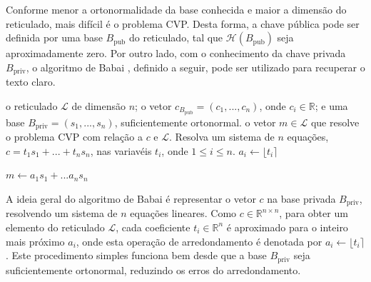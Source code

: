 \documentclass{SBCbookchapter}
\begin{document}
\begin{otherlanguage}{brazilian}
Conforme menor a ortonormalidade da base conhecida e maior a dimensão do reticulado, mais difícil é o problema CVP. 
Desta forma, a chave pública pode ser definida por uma base $B_\mathrm{pub}$ do reticulado, tal que
$\mathcal{H}(B_\mathrm{pub})$ seja aproximadamente zero. Por outro lado, com o conhecimento da chave privada $B_\mathrm{priv}$, 
o algoritmo de Babai \cite{Babai86onlovasz}, definido a seguir, pode ser utilizado para recuperar o texto claro.

\begin{algorithm}[b]
\caption{Algoritmo de Babai}
\begin{algorithmic}
\Require o reticulado $\mathcal{L}$ de dimensão $n$; o vetor $c_{B_\mathrm{pub}} = (c_1, ..., c_n)$, onde $c_i \in \mathbb{R}$; 
e uma base $B_\mathrm{priv} = (s_1, ..., s_n)$, suficientemente ortonormal.
\Ensure o vetor $m \in \mathcal{L}$ que resolve o problema CVP com relação a $c$ e $\mathcal{L}$.
\State Resolva um sistema de $n$ equações, $c = t_1s_1 + ... + t_ns_n$, nas variavéis $t_i$, onde $1 \leq i \leq n$.
\State $a_i \leftarrow \lfloor t_i \rceil$
\EndFor 

\Return $m \leftarrow a_1s_1 + ... a_ns_n$
\end{algorithmic}
\end{algorithm}

A ideia geral do algoritmo de Babai é representar o vetor $c$ na base privada $B_\mathrm{priv}$, resolvendo um sistema de $n$ equações lineares. Como $c \in \mathbb{R}^{n \times n}$, para obter um elemento do reticulado $\mathcal{L}$, cada coeficiente $t_i \in \mathbb{R}^n$ é aproximado 
para o inteiro mais próximo $a_i$, onde esta operação de arredondamento é denotada por $a_i  \leftarrow \lfloor t_i \rceil$. Este procedimento simples funciona bem desde que a base $B_\mathrm{priv}$ seja suficientemente ortonormal, reduzindo os erros do arredondamento.  

\begin{figure}[h]
\begin{center}
\end{center}
\end{figure}
\end{otherlanguage}
\end{document}
